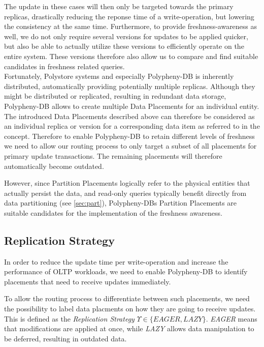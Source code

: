 The update in these cases will then only be targeted towards the primary replicas, drastically reducing the reponse time of a write-operation,
but lowering the consistency at the same time. 
Furthermore, to provide freshness-awareness as well, we do not only require several versions for updates to be applied quicker,
but also be able to actually utilize these versions to efficiently operate on the entire system.
These versions therefore also allow us to compare and find suitable candidates in freshness related queries.\\
Fortunately, Polystore systems and especially Polypheny-DB is inherently distributed, automatically providing potentially multiple replicas.
Although they might be distributed or replicated, resulting in redundant data storage, Polypheny-DB allows to create multiple Data Placements for an individual entity.
The introduced Data Placements described above can therefore be considered as an individual replica or version for a corresponding data item as referred to in the concept.
Therefore to enable Polypheny-DB to retain different levels of freshness we need to allow our routing process
to only target a subset of all placements for primary update transactions. The remaining placements will therefore automatically become outdated. 

However, since Partition Placements logically refer to the physical entities that actually persist the data, and 
read-only queries typically benefit directly from data partitioning (see \ref{sec:part}), Polypheny-DBs Partition Placements 
are suitable candidates for the implementation of the freshness awareness.





\subsection{Replication Strategy}
\label{sec:strategy}

In order to reduce the update time per write-operation and increase the performance
of OLTP workloads, we need to enable Polypheny-DB to identify placements that need to receive updates immediately. 

To allow the routing process to differentiate between such placements,
we need the possibility to label data placments on how they are going to receive updates. This is defined as the \emph{Replication Strategy} $\Upsilon \in \{EAGER,LAZY\}$.
\emph{EAGER} means that modifications are applied at once, while \emph{LAZY}
allows data manipulation to be deferred, resulting in outdated data.


